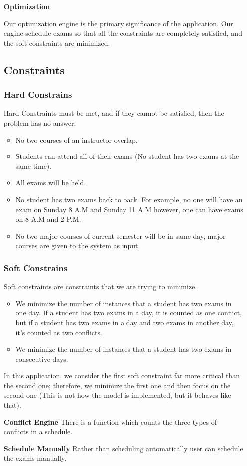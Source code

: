 \documentclass{report}
\begin{document}
\begin{itemize}
	\item[\textbf{Optimization}] {Our optimization engine is the primary significance of the application. Our engine schedule exams so that all the constraints are completely satisfied, and the soft constraints are minimized.
		\subsection{Constraints}
		\subsubsection{Hard Constrains}
			Hard Constraints must be met, and if they cannot be satisfied, then the problem has no answer.
			\begin{itemize}
				\item{No two courses of an instructor overlap.}
				\item{Students can attend all of their exams (No student has two exams at the same time).}
				\item{All exams will be held.}
				\item{No student has two exams back to back. For example, no one will have an exam on Sunday 8 A.M and Sunday 11 A.M however, one can have exams on 8 A.M and 2 P.M.}
				\item{No two major courses of current semester will be in same day, major courses are given to the system as input.}
			\end{itemize}
		\subsubsection{Soft Constrains}
						Soft constraints are constraints that we are trying to minimize. 
			\begin{itemize}
				\item{We minimize the number of instances that a student has two exams in one day. If a student has two exams in a day, it is counted as one conflict, but if a student has two exams in a day and two exams in another day, it's counted as two conflicts.}
				\item{We minimize the number of instances that a student has two exams in consecutive days.}
			\end{itemize}
			In this application, we consider the first soft constraint far more critical than the second one; therefore, we minimize the first one and then focus on the second one (This is not how the model is implemented, but it behaves like that).
		}
	\item[\textbf{Conflict Engine}] {There is a function which counts the three types of conflicts in a schedule. }
	\item[\textbf{Schedule Manually}] {Rather than scheduling automatically user can schedule the exams manually.}
\end{itemize}
\end{document}

